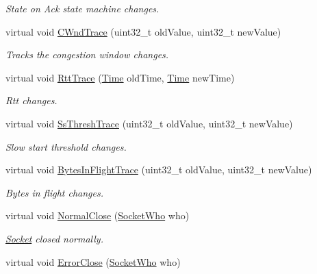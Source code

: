 \begin{DoxyCompactItemize}
\begin{DoxyCompactList}\small\item\em State on Ack state machine changes. \end{DoxyCompactList}\item 
virtual void \hyperlink{classns3_1_1TcpGeneralTest_a2ab19c9303805ace0ab1ec2aa0d57c54}{C\+Wnd\+Trace} (uint32\+\_\+t old\+Value, uint32\+\_\+t new\+Value)
\begin{DoxyCompactList}\small\item\em Tracks the congestion window changes. \end{DoxyCompactList}\item 
virtual void \hyperlink{classns3_1_1TcpGeneralTest_af6dc2fcbb42268b3dcf5b3897564edf2}{Rtt\+Trace} (\hyperlink{classns3_1_1Time}{Time} old\+Time, \hyperlink{classns3_1_1Time}{Time} new\+Time)
\begin{DoxyCompactList}\small\item\em Rtt changes. \end{DoxyCompactList}\item 
virtual void \hyperlink{classns3_1_1TcpGeneralTest_a4cb26d8f5e11c39a8ef6359584caa254}{Ss\+Thresh\+Trace} (uint32\+\_\+t old\+Value, uint32\+\_\+t new\+Value)
\begin{DoxyCompactList}\small\item\em Slow start threshold changes. \end{DoxyCompactList}\item 
virtual void \hyperlink{classns3_1_1TcpGeneralTest_a5783fc6fc5d13a826554e91986927efc}{Bytes\+In\+Flight\+Trace} (uint32\+\_\+t old\+Value, uint32\+\_\+t new\+Value)
\begin{DoxyCompactList}\small\item\em Bytes in flight changes. \end{DoxyCompactList}\item 
virtual void \hyperlink{classns3_1_1TcpGeneralTest_a38d972b53fbdb443df17121b9a6a31b3}{Normal\+Close} (\hyperlink{classns3_1_1TcpGeneralTest_a29338e6b7137cad650c2ff835713f6ee}{Socket\+Who} who)
\begin{DoxyCompactList}\small\item\em \hyperlink{classns3_1_1Socket}{Socket} closed normally. \end{DoxyCompactList}\item 
virtual void \hyperlink{classns3_1_1TcpGeneralTest_a7094bdc5082e1d76ef84afb8ee11268f}{Error\+Close} (\hyperlink{classns3_1_1TcpGeneralTest_a29338e6b7137cad650c2ff835713f6ee}{Socket\+Who} who)

\end{DoxyCompactItemize}

